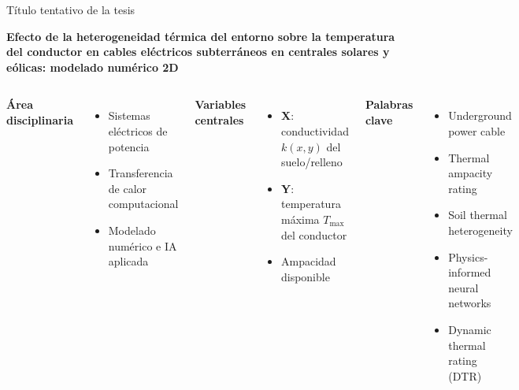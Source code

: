 \documentclass[aspectratio=169]{beamer}
\begin{document}
\begin{frame}{Título tentativo de la tesis}
\begin{block}{}
\centering\large
\textbf{Efecto de la heterogeneidad térmica del entorno sobre la temperatura del
conductor en cables eléctricos subterráneos en centrales solares y eólicas: modelado numérico 2D}
\end{block}

\vspace{0.6em}
\begin{columns}[T]
\textbf{Área disciplinaria}
\begin{itemize}[leftmargin=*]\small
  \item Sistemas eléctricos de potencia
  \item Transferencia de calor computacional
  \item Modelado numérico e IA aplicada
\end{itemize}

\textbf{Variables centrales}
\begin{itemize}[leftmargin=*]\small
  \item \textbf{X}: conductividad $k(x,y)$ del suelo/relleno
  \item \textbf{Y}: temperatura máxima $T_{\max}$ del conductor
  \item Ampacidad disponible
\end{itemize}

\textbf{Palabras clave}
\begin{itemize}[leftmargin=*]\small
  \item Underground power cable
  \item Thermal ampacity rating
  \item Soil thermal heterogeneity
  \item Physics-informed neural networks
  \item Dynamic thermal rating (DTR)
\end{itemize}
\end{columns}
\end{frame}
\end{document}
